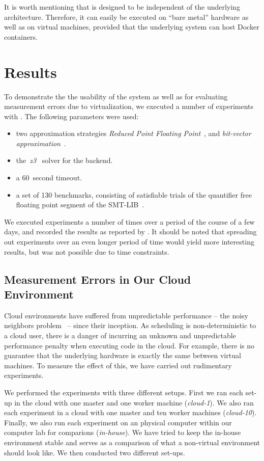 \documentclass[a4paper]{IEEEtran}
\begin{document}
It is worth mentioning that \testbench{} is designed to be independent of the
underlying architecture. Therefore, it can easily be executed on ``bare metal''
hardware as well as on virtual machines, provided that the underlying system can
host Docker containers.

\section{Results}
To demonstrate the the usability of the system as well as for evaluating
measurement errors due to virtualization, we executed a number of experiments
with \testbench{}. The following parameters were used:
\begin{itemize}
\item two approximation strategies \emph{Reduced Point Floating
  Point}~\cite{uppsat}, and \emph{bit-vector
  approximation}~\cite{joel}.

\item the~\emph{z3}~\cite{z3} solver for the backend.

\item a 60~second timeout.

\item a set of 130 benchmarks, consisting of satisfiable trials of the
  quantifier free floating point segment of the SMT-LIB~\cite{smtlib}.
\end{itemize}
We executed experiments a number of times over a period of the course
of a few days, and recorded the results as reported by
\testbench{}. It should be noted that spreading out experiments over
an even longer period of time would yield more interesting results,
but was not possible due to time constraints.


\subsection{Measurement Errors in Our Cloud Environment}
Cloud environments have suffered from unpredictable performance -- the
noisy neighbors problem~\cite{williamson} -- since their inception. As
scheduling is non-deterministic to a cloud user, there is a danger of
incurring an unknown and unpredictable performance penalty when
executing code in the cloud. For example, there is no guarantee that
the underlying hardware is exactly the same between virtual
machines. To measure the effect of this, we have carried out
rudimentary experiments.

We performed the experiments with three different setups. First we ran
each set-up in the cloud with one master and one worker machine
(\emph{cloud-1}). We also ran each experiment in a cloud with one
master and ten worker machines (\emph{cloud-10}). Finally, we also run
each experiment on an physical computer within our computer lab for
comparions (\emph{in-house}). We have tried to keep the in-house
environment stable and serves as a comparison of what a non-virtual
environment should look like. We then conducted two different set-ups.
\end{document}
